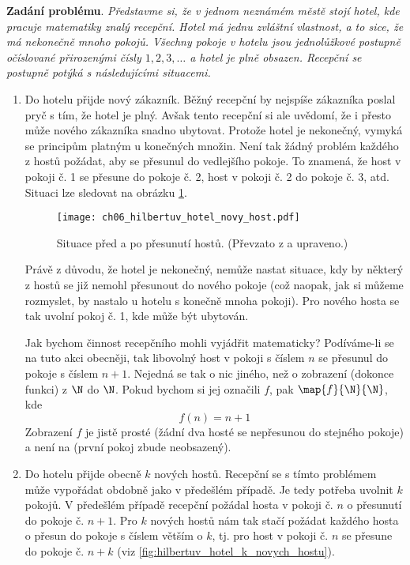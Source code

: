 \noindent\textbf{Zadání problému}. \textit{Představme si, že v jednom neznámém městě stojí hotel, kde pracuje matematiky znalý recepční. Hotel má jednu zvláštní vlastnost, a to sice, že má nekonečně mnoho pokojů. Všechny pokoje v hotelu jsou jednolůžkové postupně očíslované přirozenými čísly $1,2,3,\dots$ a hotel je plně obsazen. Recepční se postupně potýká s následujícími situacemi.}
\begin{enumerate}[label=\textit{(\roman*)}]
    \item\label{item:novy_host} Do hotelu přijde nový zákazník. Běžný recepční by nejspíše zákazníka poslal pryč s tím, že hotel je plný. Avšak tento recepční si ale uvědomí, že i přesto může nového zákazníka snadno ubytovat. Protože hotel je nekonečný, vymyká se principům platným u konečných množin. Není tak žádný problém každého z hostů požádat, aby se přesunul do vedlejšího pokoje. To znamená, že host v pokoji č. 1 se přesune do pokoje č. 2, host v pokoji č. 2 do pokoje č. 3, atd. Situaci lze sledovat na obrázku \ref{fig:hilbertuv_hotel_novy_host}.
    \begin{figure}[h]
        \centering
        \texttt{[image: ch06\_hilbertuv\_hotel\_novy\_host.pdf]}
        \caption{Situace před a po přesunutí hostů. (Převzato z \cite{Rmoutil2022} a upraveno.)}
        \label{fig:hilbertuv_hotel_novy_host}
    \end{figure}
    Právě z důvodu, že hotel je nekonečný, nemůže nastat situace, kdy by některý z hostů se již nemohl přesunout do nového pokoje (což naopak, jak si můžeme rozmyslet, by nastalo u hotelu s konečně mnoha pokoji). Pro nového hosta se tak uvolní pokoj č. 1, kde může být ubytován.\par
    Jak bychom činnost recepčního mohli vyjádřit matematicky? Podíváme-li se na tuto akci obecněji, tak libovolný host v pokoji s číslem $n$ se přesunul do pokoje s číslem $n+1$. Nejedná se tak o nic jiného, než o zobrazení (dokonce funkci) z $\N$ do $\N$. Pokud bychom si jej označili $f$, pak $\map{f}{\N}{\N}$, kde
    \begin{equation*}
        f(n)=n+1
    \end{equation*}
    Zobrazení $f$ je jistě prosté (žádní dva hosté se nepřesunou do stejného pokoje) a není na (první pokoj zbude neobsazený).
    \item\label{item:k_novych_hostu} Do hotelu přijde obecně $k$ nových hostů. Recepční se s tímto problémem může vypořádat obdobně jako v předešlém případě. Je tedy potřeba uvolnit $k$ pokojů. V předešlém případě recepční požádal hosta v pokoji č. $n$ o přesunutí do pokoje č. $n+1$. Pro $k$ nových hostů nám tak stačí požádat každého hosta o přesun do pokoje s číslem větším o $k$, tj. pro host v pokoji č. $n$ se přesune do pokoje č. $n+k$ (viz \ref{fig:hilbertuv_hotel_k_novych_hostu}).

\end{enumerate}
